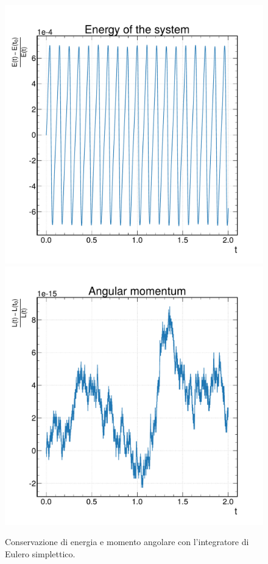 \documentclass[10pt,a4paper]{article}
\begin{document}
\begin{figure}
\centering
\includegraphics[scale=0.3]{img/ene_euler_simpl.pdf}
\includegraphics[scale=0.3]{img/ang_euler_simpl.pdf}
\caption{Conservazione di energia e momento angolare con l'integratore di Eulero simplettico.}
\end{figure}
\FloatBarrier
\end{document}
